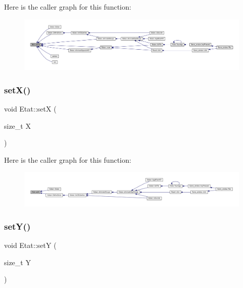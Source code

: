 Here is the caller graph for this function\+:\nopagebreak
\begin{figure}[H]
\begin{center}
\leavevmode
\includegraphics[width=350pt]{class_etat_aa88987ca54aee676717f05e4570c0aec_icgraph}
\end{center}
\end{figure}
\mbox{\label{class_etat_ac020c4fe222274ac849a03fc8f19a99a}} 
\subsubsection{\texorpdfstring{set\+X()}{setX()}}
{\footnotesize\ttfamily void Etat\+::setX (\begin{DoxyParamCaption}\item[{size\+\_\+t}]{X }\end{DoxyParamCaption})}

Here is the caller graph for this function\+:\nopagebreak
\begin{figure}[H]
\begin{center}
\leavevmode
\includegraphics[width=350pt]{class_etat_ac020c4fe222274ac849a03fc8f19a99a_icgraph}
\end{center}
\end{figure}
\mbox{\label{class_etat_a8a54fc9ecb1b97d84d2f1f259e3bf70e}} 
\subsubsection{\texorpdfstring{set\+Y()}{setY()}}
{\footnotesize\ttfamily void Etat\+::setY (\begin{DoxyParamCaption}\item[{size\+\_\+t}]{Y }\end{DoxyParamCaption})}


